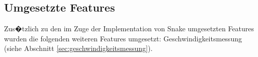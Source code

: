 \subsection{Umgesetzte Features}
Zus�tzlich zu den im Zuge der Implementation von Snake umgesetzten Features wurden die folgenden weiteren Features umgesetzt:
Geschwindigkeitsmessung (siehe Abschnitt \ref{sec:geschwindigkeitsmessung}).
